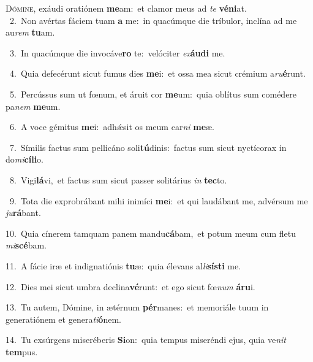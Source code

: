 \lettrine{\initial\textcolor{\initialcolor}{D}}{ómine,} exáudi oratiónem \textbf{me}\-am:~\star et clamor meus ad \textit{te} \textbf{vé}\-\textbf{ni}at.\\
{\numbfont\textcolor{\numbcolor}{~2.}}~Non avértas fáciem tuam \textbf{a} me:~\star in quacúmque die tríbulor, inclína ad me au\textit{rem} \textbf{tu}\-am.\par
{\numbfont\textcolor{\numbcolor}{~3.}}~In quacúmque die invocáve\textbf{ro} te:~\star velóciter \textit{ex}\-\textbf{áu}\textbf{di} me.\par
{\numbfont\textcolor{\numbcolor}{~4.}}~Quia defecérunt sicut fumus dies \textbf{me}\-i:~\star et ossa mea sicut crémium a\-\textit{ru}\-\textbf{é}runt.\par
{\numbfont\textcolor{\numbcolor}{~5.}}~Percússus sum ut fœnum, et áruit cor \textbf{me}\-um:~\star quia oblítus sum comédere pa\textit{nem} \textbf{me}\-um.\par
{\numbfont\textcolor{\numbcolor}{~6.}}~A voce gémitus \textbf{me}\-i:~\star adhǽsit os meum car\textit{ni} \textbf{me}\-æ.\par
{\numbfont\textcolor{\numbcolor}{~7.}}~Símilis factus sum pellicáno soli\-\textbf{tú}\-dinis:~\star factus sum sicut nyctícorax in do\-\textit{mi}\-\textbf{cí}\textbf{li}o.\par
{\numbfont\textcolor{\numbcolor}{~8.}}~Vigi\-\textbf{lá}\-vi,~\star et factus sum sicut passer solitárius \textit{in} \textbf{tec}\-to.\par
{\numbfont\textcolor{\numbcolor}{~9.}}~Tota die exprobrábant mihi inimíci \textbf{me}\-i:~\star et qui laudábant me, advérsum me \textit{ju}\-\textbf{rá}bant.\par
{\numbfont\textcolor{\numbcolor}{10.}}~Quia cínerem tamquam panem mandu\-\textbf{cá}\-bam,~\star et potum meum cum fletu \textit{mi}\-\textbf{scé}bam.\par
{\numbfont\textcolor{\numbcolor}{11.}}~A fácie iræ et indignatiónis \textbf{tu}\-æ:~\star quia élevans al\-\textit{li}\-\textbf{sís}\textbf{ti} me.\par
{\numbfont\textcolor{\numbcolor}{12.}}~Dies mei sicut umbra declina\-\textbf{vé}\-runt:~\star et ego sicut fœ\textit{num} \textbf{á}\-\textbf{ru}i.\par
{\numbfont\textcolor{\numbcolor}{13.}}~Tu autem, Dómine, in ætérnum \textbf{pér}\-manes:~\star et memoriále tuum in generatiónem et genera\-\textit{ti}\-\textbf{ó}nem.\par
{\numbfont\textcolor{\numbcolor}{14.}}~Tu exsúrgens miseréberis \textbf{Si}\-on:~\star quia tempus miseréndi ejus, quia ve\textit{nit} \textbf{tem}\-pus.\par
